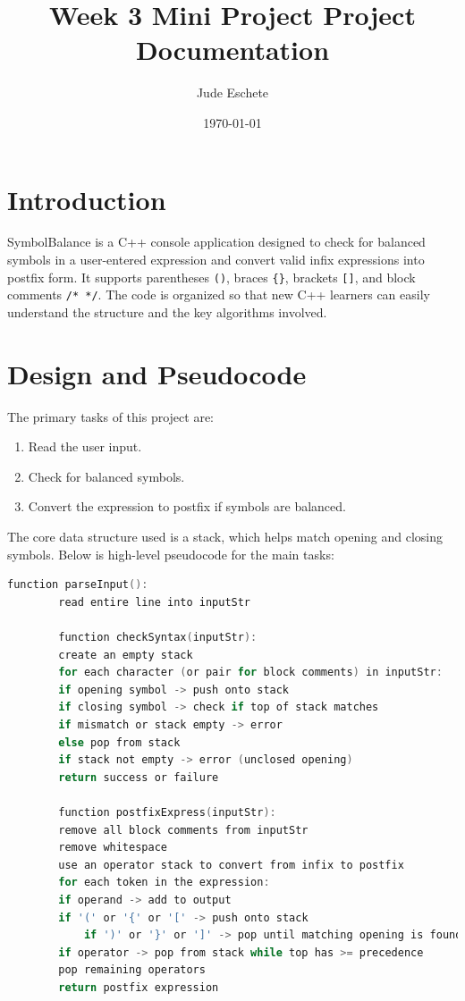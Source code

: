 \documentclass[12pt]{article}
\title{Week 3 Mini Project Project Documentation}
\author{Jude Eschete}
\date{\today}
\begin{document}
	
	\maketitle
	
	\section{Introduction}
	SymbolBalance is a C++ console application designed to check for balanced symbols in a user-entered expression and convert valid infix expressions into postfix form. It supports parentheses \texttt{()}, braces \texttt{\{\}}, brackets \texttt{[]}, and block comments \texttt{/* */}. The code is organized so that new C++ learners can easily understand the structure and the key algorithms involved.
	
	\section{Design and Pseudocode}
	The primary tasks of this project are:
	\begin{enumerate}
		\item Read the user input.
		\item Check for balanced symbols.
		\item Convert the expression to postfix if symbols are balanced.
	\end{enumerate}
	
	The core data structure used is a stack, which helps match opening and closing symbols. Below is high-level pseudocode for the main tasks:
	
	\begin{lstlisting}[language=C, caption={SymbolBalance Pseudocode}]
		function parseInput():
		read entire line into inputStr
		
		function checkSyntax(inputStr):
		create an empty stack
		for each character (or pair for block comments) in inputStr:
		if opening symbol -> push onto stack
		if closing symbol -> check if top of stack matches
		if mismatch or stack empty -> error
		else pop from stack
		if stack not empty -> error (unclosed opening)
		return success or failure
		
		function postfixExpress(inputStr):
		remove all block comments from inputStr
		remove whitespace
		use an operator stack to convert from infix to postfix
		for each token in the expression:
		if operand -> add to output
		if '(' or '{' or '[' -> push onto stack
			if ')' or '}' or ']' -> pop until matching opening is found
		if operator -> pop from stack while top has >= precedence
		pop remaining operators
		return postfix expression
	\end{lstlisting}
	
\end{document}
